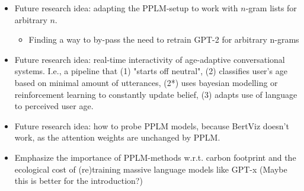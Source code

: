\begin{itemize}
\begin{itemize}
        \end{itemize}
    \item Future research idea: adapting the PPLM-setup to work with $n$-gram lists for arbitrary $n$.
        \begin{itemize}
            \item Finding a way to by-pass the need to retrain GPT-2 for arbitrary n-grams
        \end{itemize}
    \item Future research idea: real-time interactivity of age-adaptive conversational systems. I.e., a pipeline that (1) "starts off neutral", (2) classifies user's age based on minimal amount of utterances, (2*) uses bayesian modelling or reinforcement learning to constantly update belief, (3) adapts use of language to perceived user age.
    \item Future research idea: how to probe PPLM models, because BertViz doesn't work, as the attention weights are unchanged by PPLM.
    \item Emphasize the importance of PPLM-methods w.r.t. carbon footprint and the ecological cost of (re)training massive language models like GPT-x (Maybe this is better for the introduction?)
\end{itemize}